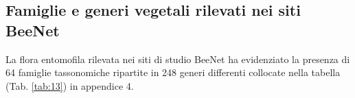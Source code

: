 \documentclass[main.tex]{subfiles}
\begin{document}
\subsection{Famiglie e generi vegetali rilevati nei siti BeeNet}

La flora entomofila rilevata nei siti di studio BeeNet ha evidenziato la presenza di 64 famiglie tassonomiche ripartite in 248 generi differenti collocate nella tabella (Tab. \ref{tab:13}) in appendice 4.
\end{document}
